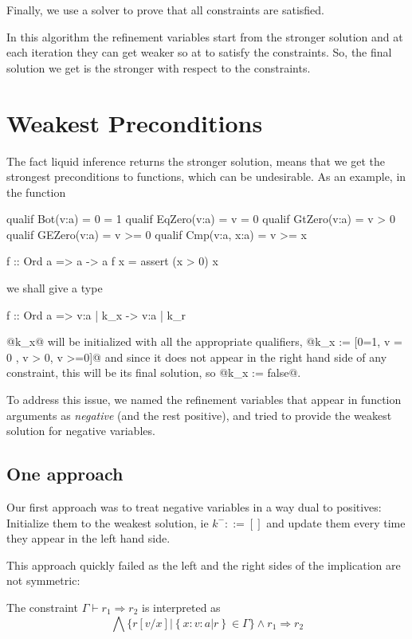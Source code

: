 \documentclass[10pt,a4paper]{article}
\newcommand\issubref[3]{\ensuremath{#1 \vdash #2 \Rightarrow #3}}
\begin{document}
Finally, we use a solver to prove that all constraints are satisfied.


In this algorithm the refinement variables start from the stronger solution 
and at each iteration they can get weaker so at to satisfy the constraints.
%
So, the final solution we get is the stronger with respect to the constraints.

\section*{Weakest Preconditions}

The fact liquid inference returns the stronger solution, 
means that we get the strongest preconditions to functions, 
which can be undesirable.
%
As an example,
in the function
\begin{code}
qualif Bot(v:a)      = 0 =  1
qualif EqZero(v:a)   = v =  0
qualif GtZero(v:a)   = v >  0 
qualif GEZero(v:a)   = v >= 0 
qualif Cmp(v:a, x:a) = v >= x

f :: Ord a => a -> a
f x = assert (x > 0) x
\end{code}
we shall give a type

\begin{code}
f :: Ord a => {v:a | k_x} -> {v:a | k_r}
\end{code}

@k_x@ will be initialized with all the appropriate qualifiers, 
@k_x := [0=1, v = 0 , v > 0, v >=0]@
and since it does not appear in the right hand side of any constraint, 
this will be its final solution, so @k_x := false@.

To address this issue, we named the refinement variables that appear in 
function arguments as \textit{negative} (and the rest positive), 
and tried to provide the weakest solution for negative variables.

\subsection*{One approach}
Our first approach was to treat negative variables 
in a way dual to positives:
Initialize them to the weakest solution, ie $k^- ::= []$
and update them every time they appear in the left hand side.

This approach quickly failed as the left and the right sides of the 
implication are not symmetric:

The constraint \issubref{\Gamma}{r_1}{r_2} is interpreted as
$$\bigwedge \{r[v/x] |\left\lbrace x:{v:a | r}\right\rbrace \in \Gamma \} \land r_1 \Rightarrow r_2$$
\end{document}
